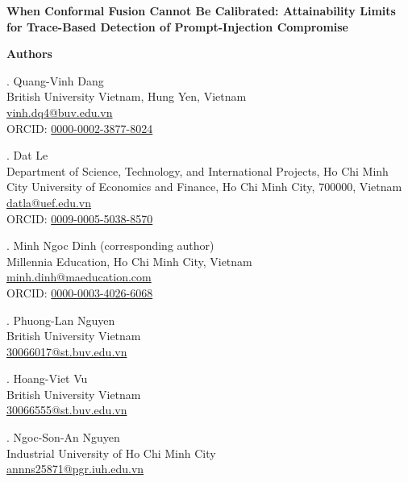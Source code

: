 \documentclass[11pt]{article}
\begin{document}
\begin{center}
{\large\bfseries When Conformal Fusion Cannot Be Calibrated: Attainability Limits
for Trace-Based Detection of Prompt-Injection Compromise}
\end{center}

\vspace{1em}

\noindent\textbf{Authors}

\vspace{0.4em}
. Quang-Vinh Dang\\
British University Vietnam, Hung Yen, Vietnam\\
\href{mailto:vinh.dq4@buv.edu.vn}{vinh.dq4@buv.edu.vn}\\
ORCID: \href{https://orcid.org/0000-0002-3877-8024}{0000-0002-3877-8024}

\vspace{0.6em}
. Dat Le\\
Department of Science, Technology, and International Projects, Ho Chi Minh City
University of Economics and Finance, Ho Chi Minh City, 700000, Vietnam\\
\href{mailto:datla@uef.edu.vn}{datla@uef.edu.vn}\\
ORCID: \href{https://orcid.org/0009-0005-5038-8570}{0009-0005-5038-8570}

\vspace{0.6em}
. Minh Ngoc Dinh (corresponding author)\\
Millennia Education, Ho Chi Minh City, Vietnam\\
\href{mailto:minh.dinh@maeducation.com}{minh.dinh@maeducation.com}\\
ORCID: \href{https://orcid.org/0000-0003-4026-6068}{0000-0003-4026-6068}

\vspace{0.6em}
. Phuong-Lan Nguyen\\
British University Vietnam\\
\href{mailto:30066017@st.buv.edu.vn}{30066017@st.buv.edu.vn}

\vspace{0.6em}
. Hoang-Viet Vu\\
British University Vietnam\\
\href{mailto:30066555@st.buv.edu.vn}{30066555@st.buv.edu.vn}

\vspace{0.6em}
. Ngoc-Son-An Nguyen\\
Industrial University of Ho Chi Minh City\\
\href{mailto:annns25871@pgr.iuh.edu.vn}{annns25871@pgr.iuh.edu.vn}
\end{document}
